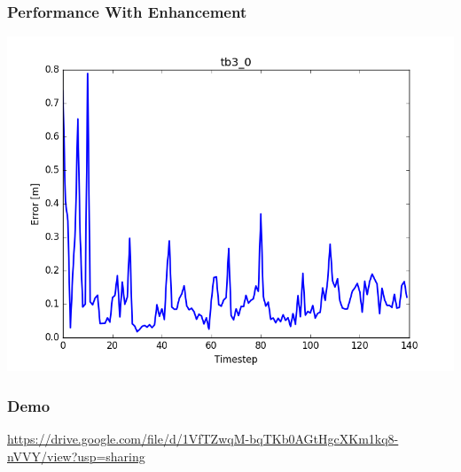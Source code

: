 \documentclass{beamer}
\begin{document}
	\begin{frame}
		\frametitle{Performance With Enhancement}
		\includegraphics[width=\columnwidth]{figure_l1.png}
	\end{frame}
	\begin{frame}
		\frametitle{Demo}
		\url{https://drive.google.com/file/d/1VfTZwqM-bqTKb0AGtHgcXKm1kq8-nVVY/view?usp=sharing}
	\end{frame}
\end{document}
